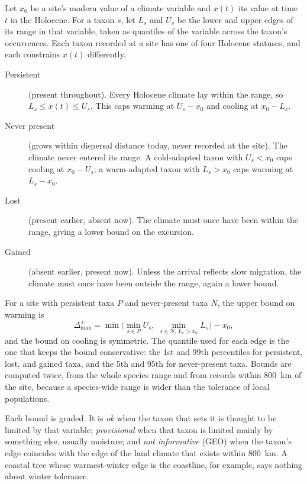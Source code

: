 \documentclass[11pt]{article}
\begin{document}
Let $x_0$ be a site's modern value of a climate variable and $x(t)$ its value at time $t$ in the Holocene. For a taxon $s$, let $L_s$ and $U_s$ be the lower and upper edges of its range in that variable, taken as quantiles of the variable across the taxon's occurrences. Each taxon recorded at a site has one of four Holocene statuses, and each constrains $x(t)$ differently.
\begin{description}
\item[Persistent] (present throughout). Every Holocene climate lay within the range, so $L_s \le x(t) \le U_s$. This caps warming at $U_s - x_0$ and cooling at $x_0 - L_s$.
\item[Never present] (grows within dispersal distance today, never recorded at the site). The climate never entered its range. A cold-adapted taxon with $U_s < x_0$ caps cooling at $x_0 - U_s$; a warm-adapted taxon with $L_s > x_0$ caps warming at $L_s - x_0$.
\item[Lost] (present earlier, absent now). The climate must once have been within the range, giving a lower bound on the excursion.
\item[Gained] (absent earlier, present now). Unless the arrival reflects slow migration, the climate must once have been outside the range, again a lower bound.
\end{description}
For a site with persistent taxa $P$ and never-present taxa $N$, the upper bound on warming is
\begin{equation}
\Delta^{+}_{\max} = \min\Big( \min_{s\in P} U_s,\; \min_{s\in N,\,L_s>x_0} L_s \Big) - x_0 ,
\label{eq:upmax}
\end{equation}
and the bound on cooling is symmetric. The quantile used for each edge is the one that keeps the bound conservative: the 1st and 99th percentiles for persistent, lost, and gained taxa, and the 5th and 95th for never-present taxa. Bounds are computed twice, from the whole species range and from records within 800~km of the site, because a species-wide range is wider than the tolerance of local populations.

Each bound is graded. It is \emph{ok} when the taxon that sets it is thought to be limited by that variable; \emph{provisional} when that taxon is limited mainly by something else, usually moisture; and \emph{not informative} (GEO) when the taxon's edge coincides with the edge of the land climate that exists within 800~km. A coastal tree whose warmest-winter edge is the coastline, for example, says nothing about winter tolerance.
\end{document}
